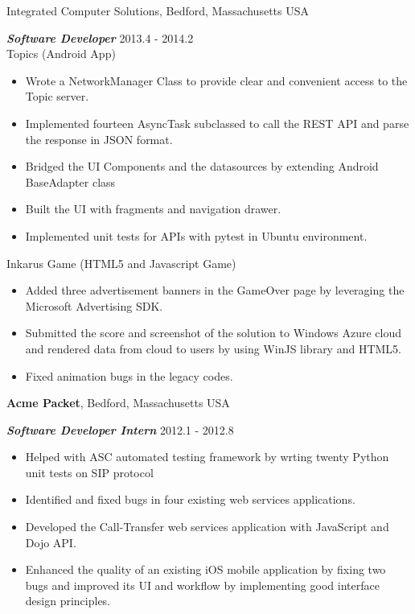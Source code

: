 \documentclass[margin,line]{res}
\begin{document}
\begin{resume}
{Integrated Computer Solutions}, Bedford, Massachusetts USA

\vspace{-.3cm}
{\em {\bf Software Developer}} \hfill {2013.4 - 2014.2}\\
Topics (Android App)
\begin{itemize}
\item Wrote a NetworkManager Class to provide clear and convenient access to the Topic server.
\item Implemented fourteen AsyncTask subclassed to call the REST API and parse the response
in JSON format.
\item Bridged the UI Components and the datasources by extending Android BaseAdapter class
\item Built the UI with fragments and navigation drawer.
\item Implemented unit tests for APIs with pytest in Ubuntu environment.
\end{itemize}

Inkarus Game (HTML5 and Javascript Game)
\begin{itemize}
\item Added three advertisement banners in the GameOver page by leveraging
the Microsoft Advertising SDK.
\item Submitted the score and screenshot of the solution to Windows Azure cloud
and rendered data from cloud to users by using WinJS library and HTML5.
\item Fixed animation bugs in the legacy codes.
\end{itemize}

{\bf Acme Packet}, Bedford, Massachusetts USA

\vspace{-.3cm}
{\em \bf {Software Developer Intern}} \hfill {2012.1 - 2012.8}\\
\begin{itemize}
\item Helped with ASC automated testing framework by wrting twenty Python unit tests on SIP protocol
\item Identified and fixed bugs in four existing web services applications.
\item Developed the Call-Transfer web services application with JavaScript and Dojo API.
\item Enhanced the quality of an existing iOS mobile application by fixing two bugs and improved its UI and workflow by implementing good interface design principles.
\end{itemize}


\end{resume}
\end{document}
